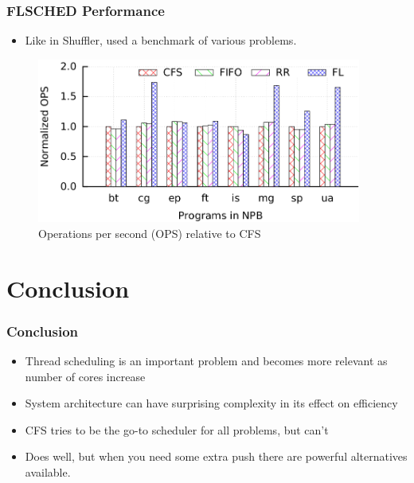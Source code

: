 \documentclass{beamer}
\newcommand{\linespace}{\vskip 0.25cm}
\begin{document}
\begin{frame}
\frametitle{FLSCHED Performance}
\begin{itemize}

\item Like in Shuffler, used a benchmark of various problems.

\end{itemize}
\begin{figure}
\caption*{Operations per second (OPS) relative to CFS}
\centering
\includegraphics[width=0.95\textwidth]{Illustrations/FLSCHED_OPS.png}

\end{figure}
\end{frame}

\section[Conclusion]{Conclusion}

\begin{frame}
\frametitle{Conclusion}

\begin{itemize}
\item Thread scheduling is an important problem and becomes more relevant as number of cores increase

\linespace

\item System architecture can have surprising complexity in its effect on efficiency

\linespace

\item CFS tries to be the go-to scheduler for all problems, but can't

\item Does well, but when you need some extra push there are powerful alternatives available.

\end{itemize}
\end{frame}
\end{document}
